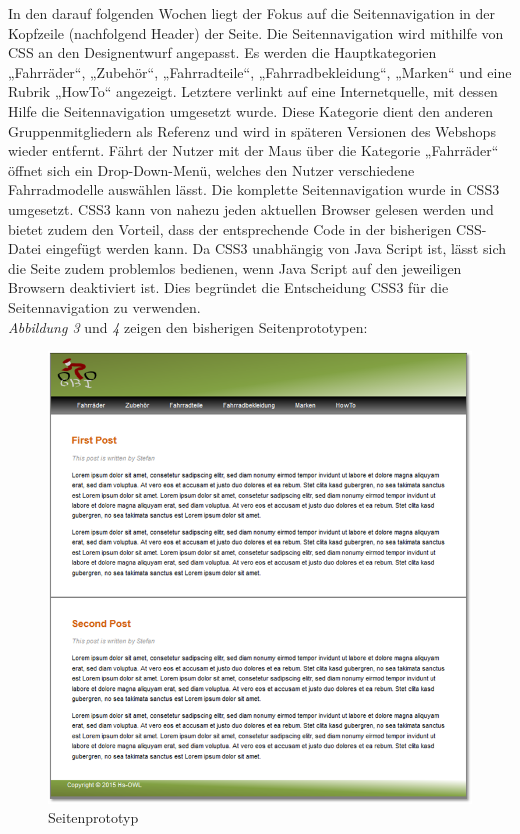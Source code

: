 In den darauf folgenden Wochen liegt der Fokus auf die Seitennavigation in der Kopfzeile (nachfolgend Header) der Seite. Die Seitennavigation wird mithilfe von CSS an den Designentwurf angepasst. Es werden die Hauptkategorien „Fahrräder“, „Zubehör“, „Fahrradteile“, „Fahrradbekleidung“, „Marken“ und eine Rubrik „HowTo“ angezeigt. Letztere verlinkt auf eine Internetquelle, mit dessen Hilfe die Seitennavigation umgesetzt wurde. Diese Kategorie dient den anderen Gruppenmitgliedern als Referenz und wird in späteren Versionen des Webshops wieder entfernt. Fährt der Nutzer mit der Maus über die Kategorie „Fahrräder“ öffnet sich ein Drop-Down-Menü, welches den Nutzer verschiedene Fahrradmodelle auswählen lässt. Die komplette Seitennavigation wurde in CSS3 umgesetzt. CSS3 kann von nahezu jeden aktuellen Browser gelesen werden und bietet zudem den Vorteil, dass der entsprechende Code in der bisherigen CSS-Datei eingefügt werden kann. Da CSS3 unabhängig von Java Script ist, lässt sich die Seite zudem problemlos bedienen, wenn Java Script auf den jeweiligen Browsern deaktiviert ist. Dies begründet die Entscheidung CSS3 für die Seitennavigation zu verwenden.
\\
\textit{Abbildung 3} und \textit{4} zeigen den bisherigen Seitenprototypen:

\begin{figure}[H]
\begin{center}
\includegraphics[width=150mm]{Bilder/Abbildung3-Seitenprototyp.png}
\end{center}
\caption{Seitenprototyp}
\end{figure}


